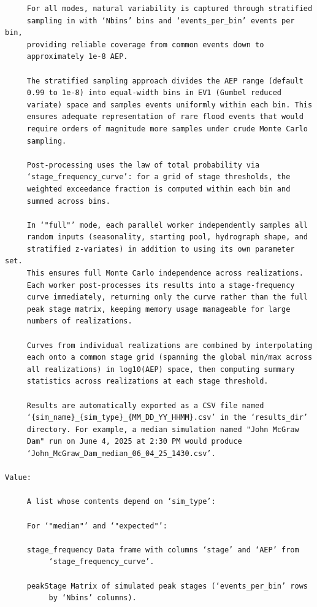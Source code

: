 \documentclass[
  letterpaper,
  DIV=11,
  numbers=noendperiod]{scrreprt}
\begin{document}
\begin{verbatim}
     For all modes, natural variability is captured through stratified
     sampling in with ‘Nbins’ bins and ‘events_per_bin’ events per bin,
     providing reliable coverage from common events down to
     approximately 1e-8 AEP.

     The stratified sampling approach divides the AEP range (default
     0.99 to 1e-8) into equal-width bins in EV1 (Gumbel reduced
     variate) space and samples events uniformly within each bin. This
     ensures adequate representation of rare flood events that would
     require orders of magnitude more samples under crude Monte Carlo
     sampling.

     Post-processing uses the law of total probability via
     ‘stage_frequency_curve’: for a grid of stage thresholds, the
     weighted exceedance fraction is computed within each bin and
     summed across bins.

     In ‘"full"’ mode, each parallel worker independently samples all
     random inputs (seasonality, starting pool, hydrograph shape, and
     stratified z-variates) in addition to using its own parameter set.
     This ensures full Monte Carlo independence across realizations.
     Each worker post-processes its results into a stage-frequency
     curve immediately, returning only the curve rather than the full
     peak stage matrix, keeping memory usage manageable for large
     numbers of realizations.

     Curves from individual realizations are combined by interpolating
     each onto a common stage grid (spanning the global min/max across
     all realizations) in log10(AEP) space, then computing summary
     statistics across realizations at each stage threshold.

     Results are automatically exported as a CSV file named
     ‘{sim_name}_{sim_type}_{MM_DD_YY_HHMM}.csv’ in the ‘results_dir’
     directory. For example, a median simulation named "John McGraw
     Dam" run on June 4, 2025 at 2:30 PM would produce
     ‘John_McGraw_Dam_median_06_04_25_1430.csv’.

Value:

     A list whose contents depend on ‘sim_type’:

     For ‘"median"’ and ‘"expected"’:

     stage_frequency Data frame with columns ‘stage’ and ‘AEP’ from
          ‘stage_frequency_curve’.

     peakStage Matrix of simulated peak stages (‘events_per_bin’ rows
          by ‘Nbins’ columns).


\end{verbatim}
\end{document}
